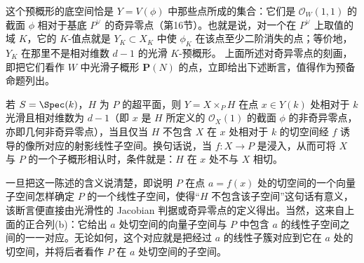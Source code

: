 这个预概形的底空间恰是 $Y=V(\phi)$ 中那些点所成的集合：它们是 $\mathcal O_W(1,1)$ 的截面 $\phi$ 相对于基底 $P^\vee$ 的奇异零点（第16节）。也就是说，对一个在 $P^\vee$ 上取值的域 $K$，它的 $K$-值点就是 $Y_K\subset X_K$ 中使 $\phi_K$ 在该点至少二阶消失的点；等价地，$Y_K$ 在那里不是相对维数 $d-1$ 的光滑 $K$-预概形。
上面所述对奇异零点的刻画，即把它们看作 $W$ 中光滑子概形 $\mathbf P(N)$ 的点，立即给出下述断言，值得作为预备命题列出。

若 $S=\Spec(k)$，$H$ 为 $P$ 的超平面，则 $Y=X\times_P H$ 在点 $x\in Y(k)$ 处相对于 $k$ 光滑且相对维数为 $d-1$（即 $x$ 是 $H$ 所定义的 $\mathcal O_X(1)$ 的截面 $\phi$ 的非奇异零点，亦即几何非奇异零点），当且仅当 $H$ 不包含 $X$ 在 $x$ 处相对于 $k$ 的切空间经 $f$ 诱导的像所对应的射影线性子空间。换句话说，当 $f:X\to P$ 是浸入，从而可将 $X$ 与 $P$ 的一个子概形相认时，条件就是：$H$ 在 $x$ 处不与 $X$ 相切。

一旦把这一陈述的含义说清楚，即说明 $P$ 在点 $a=f(x)$ 处的切空间的一个向量子空间怎样确定 $P$ 的一个线性子空间，使得“$H$ 不包含该子空间”这句话有意义，该断言便直接由光滑性的 Jacobian 判据或奇异零点的定义得出。当然，这来自上面的正合列(b)：它给出 $a$ 处切空间的向量子空间与 $P$ 中包含 $a$ 的线性子空间之间的一一对应。无论如何，这个对应就是把经过 $a$ 的线性子簇对应到它在 $a$ 处的切空间，并将后者看作 $P$ 在 $a$ 处切空间的子空间。


